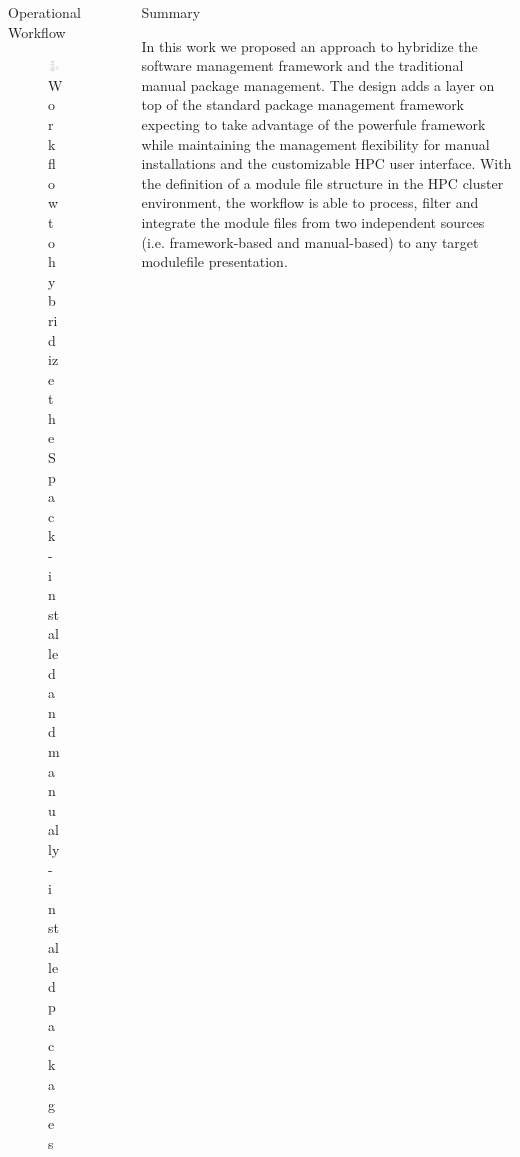\documentclass[final]{beamer}
\newlength{\sepwid}
\newlength{\onecolwid}
\begin{document}
\begin{frame}[t]
\begin{columns}[t]
\begin{column}{\onecolwid}
\begin{block}{Operational Workflow}
\begin{figure}
  \centerline{\includegraphics[width=0.8\linewidth]{figures/spack_h2_hybrid_flow}}
  \caption{Workflow to hybridize the Spack-installed and manually-installed packages}
\end{figure}


\end{block}

\end{column} %


\begin{column}{\sepwid}\end{column} %

\begin{column}{\onecolwid} %


\begin{block}{Summary}

In this work we proposed an approach to hybridize the software management framework and the traditional manual package management. 
The design adds a layer on top of the standard package management framework expecting to take advantage of the powerfule framework while maintaining the management flexibility for manual installations and the customizable HPC user interface. 
With the definition of a module file structure in the HPC cluster environment, the workflow is able to process, filter and integrate the module files from two independent sources (i.e. framework-based and manual-based) to any target modulefile presentation. 


\end{block}
\end{column}
\end{columns}
\end{frame}
\end{document}
